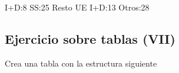 \documentclass[letterpaper,10pt,spanish]{sphinxmanual}
\begin{document}
\begin{sphinxVerbatim}[commandchars=\\\{\}]
                                                        I+D:8\PYGZpc{}
                                                        SS:25\PYGZpc{}
                                                        Resto UE
                                                        I+D:13\PYGZpc{}
                                                        Otros:28\PYGZpc{}
\end{sphinxVerbatim}


\subsection{Ejercicio sobre tablas (VII)}
\label{\detokenize{tema2:ejercicio-sobre-tablas-vii}}
Crea una tabla con la estructura siguiente
\end{document}
